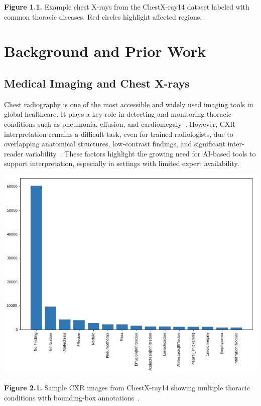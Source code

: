 \documentclass[12pt]{article}
\begin{document}
\begin{multicols}{2}
\begin{center}
    \textbf{Figure 1.1.} Example chest X-rays from the ChestX-ray14 dataset labeled with common thoracic diseases. Red circles highlight affected regions.
\end{center}

\section{Background and Prior Work}

\subsection{Medical Imaging and Chest X-rays}

Chest radiography is one of the most accessible and widely used imaging tools in global healthcare. It plays a key role in detecting and monitoring thoracic conditions such as pneumonia, effusion, and cardiomegaly~\cite{wang2017chestx}. However, CXR interpretation remains a difficult task, even for trained radiologists, due to overlapping anatomical structures, low-contrast findings, and significant inter-reader variability~\cite{wang2017chestx}. These factors highlight the growing need for AI-based tools to support interpretation, especially in settings with limited expert availability.

\begin{center}
    \includegraphics[width=\linewidth]{figure2.1.png}
    
    \textbf{Figure 2.1.} Sample CXR images from ChestX-ray14 showing multiple thoracic conditions with bounding-box annotations~\cite{wang2017chestx}.
\end{center}


\end{multicols}
\end{document}

